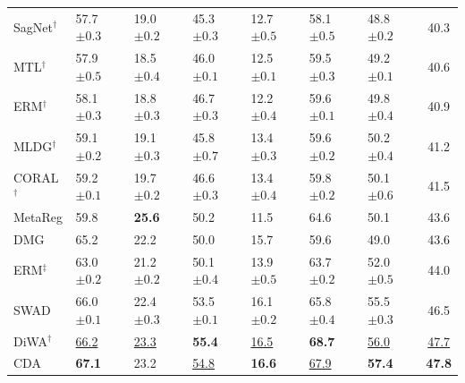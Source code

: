 \documentclass[10pt]{article}
\begin{document}
\begin{table}[H]
\begin{tabular}{lllllll|c}
SagNet$^\dagger$ & 57.7 \scriptsize$\pm0.3$ & 19.0 \scriptsize$\pm0.2$ & 45.3 \scriptsize$\pm0.3$ & 12.7 \scriptsize$\pm0.5$ & 58.1 \scriptsize$\pm0.5$ & 48.8 \scriptsize$\pm0.2$ & 40.3 \\
MTL$^\dagger$ & 57.9 \scriptsize$\pm0.5$ & 18.5 \scriptsize$\pm0.4$ & 46.0 \scriptsize$\pm0.1$ & 12.5 \scriptsize$\pm0.1$ & 59.5 \scriptsize$\pm0.3$ & 49.2 \scriptsize$\pm0.1$ & 40.6 \\
ERM$^\dagger$ & 58.1 \scriptsize$\pm0.3$ & 18.8 \scriptsize$\pm0.3$ & 46.7 \scriptsize$\pm0.3$ & 12.2 \scriptsize$\pm0.4$ & 59.6 \scriptsize$\pm0.1$ & 49.8 \scriptsize$\pm0.4$ & 40.9 \\
MLDG$^\dagger$ & 59.1 \scriptsize$\pm0.2$ & 19.1 \scriptsize$\pm0.3$ & 45.8 \scriptsize$\pm0.7$ & 13.4 \scriptsize$\pm0.3$ & 59.6 \scriptsize$\pm0.2$ & 50.2 \scriptsize$\pm0.4$ & 41.2 \\
CORAL$^\dagger$ & 59.2 \scriptsize$\pm0.1$ & 19.7 \scriptsize$\pm0.2$ & 46.6 \scriptsize$\pm0.3$ & 13.4 \scriptsize$\pm0.4$ & 59.8 \scriptsize$\pm0.2$ & 50.1 \scriptsize$\pm0.6$ & 41.5 \\
MetaReg & 59.8 & \textbf{25.6} & 50.2 & 11.5 & 64.6 & 50.1 & 43.6 \\
DMG & 65.2 & 22.2 & 50.0 & 15.7 & 59.6 & 49.0 & 43.6 \\
ERM$^\ddagger$ & 63.0 \scriptsize$\pm0.2$ & 21.2 \scriptsize$\pm0.2$ & 50.1 \scriptsize$\pm0.4$ & 13.9 \scriptsize$\pm0.5$ & 63.7 \scriptsize$\pm0.2$ & 52.0 \scriptsize$\pm0.5$ & 44.0 \\
SWAD & 66.0 \scriptsize$\pm0.1$ & 22.4 \scriptsize$\pm0.3$ & 53.5 \scriptsize$\pm0.1$ & 16.1 \scriptsize$\pm0.2$ & 65.8 \scriptsize$\pm0.4$ & 55.5 \scriptsize$\pm0.3$ & 46.5 \\
DiWA$^\dagger$ & \underline{66.2} & \underline{23.3} & \textbf{55.4} & \underline{16.5} & \textbf{68.7} & \underline{56.0} & \underline{47.7} \\
\midrule
CDA & \textbf{67.1} & 23.2 & \underline{54.8} & \textbf{16.6} & \underline{67.9} & \textbf{57.4} & \textbf{47.8} \\
\bottomrule
\end{tabular}
\end{table}
\end{document}
